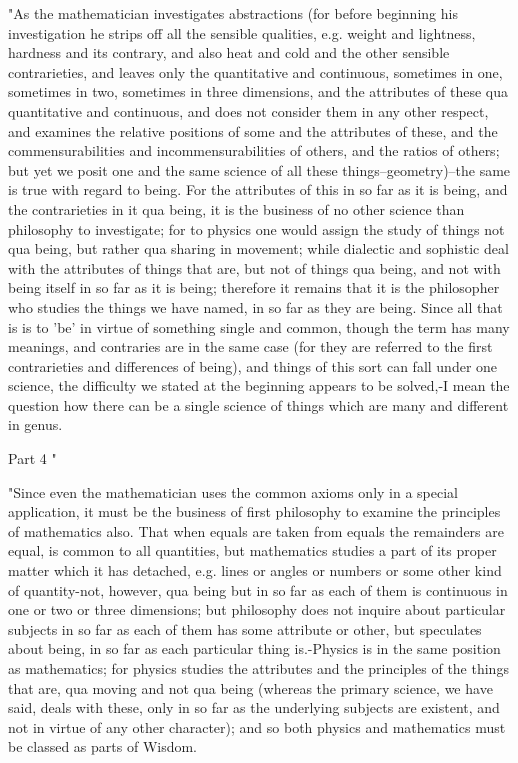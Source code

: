 "As the mathematician investigates abstractions (for before beginning
his investigation he strips off all the sensible qualities, e.g. weight
and lightness, hardness and its contrary, and also heat and cold and
the other sensible contrarieties, and leaves only the quantitative
and continuous, sometimes in one, sometimes in two, sometimes in three
dimensions, and the attributes of these qua quantitative and continuous,
and does not consider them in any other respect, and examines the
relative positions of some and the attributes of these, and the commensurabilities
and incommensurabilities of others, and the ratios of others; but
yet we posit one and the same science of all these things--geometry)--the
same is true with regard to being. For the attributes of this in so
far as it is being, and the contrarieties in it qua being, it is the
business of no other science than philosophy to investigate; for to
physics one would assign the study of things not qua being, but rather
qua sharing in movement; while dialectic and sophistic deal with the
attributes of things that are, but not of things qua being, and not
with being itself in so far as it is being; therefore it remains that
it is the philosopher who studies the things we have named, in so
far as they are being. Since all that is is to 'be' in virtue of something
single and common, though the term has many meanings, and contraries
are in the same case (for they are referred to the first contrarieties
and differences of being), and things of this sort can fall under
one science, the difficulty we stated at the beginning appears to
be solved,-I mean the question how there can be a single science of
things which are many and different in genus. 

Part 4 "

"Since even the mathematician uses the common axioms only in a special
application, it must be the business of first philosophy to examine
the principles of mathematics also. That when equals are taken from
equals the remainders are equal, is common to all quantities, but
mathematics studies a part of its proper matter which it has detached,
e.g. lines or angles or numbers or some other kind of quantity-not,
however, qua being but in so far as each of them is continuous in
one or two or three dimensions; but philosophy does not inquire about
particular subjects in so far as each of them has some attribute or
other, but speculates about being, in so far as each particular thing
is.-Physics is in the same position as mathematics; for physics studies
the attributes and the principles of the things that are, qua moving
and not qua being (whereas the primary science, we have said, deals
with these, only in so far as the underlying subjects are existent,
and not in virtue of any other character); and so both physics and
mathematics must be classed as parts of Wisdom. 

